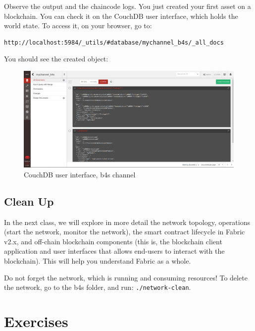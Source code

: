 \documentclass[12pt,a4paper]{article}
\theoremstyle{definition}
\begin{document}
Observe the output and the chaincode logs.
You just created your first asset on a blockchain. You can check it on the CouchDB user interface, which holds the world state. To access it, on your browser, go to: 
\begin{verbatim}
http://localhost:5984/_utils/#database/mychannel_b4s/_all_docs
\end{verbatim}

You should see the created object:

\begin{figure}[h]
    \centering
    \includegraphics[scale=0.2]{figures/couchdb.png}
    \caption{CouchDB user interface, b4s channel}
    \label{fig:cdb}
\end{figure}

\subsection{Clean Up}

In the next class, we will explore in more detail the network topology, operations (start the network, monitor the network), the smart contract lifecycle in Fabric v2.x, and off-chain blockchain components (this is, the blockchain client application and user interfaces that allows end-users to interact with the blockchain). This will help you understand Fabric as a whole.

Do not forget the network, which is running and consuming resources! To delete the network, go to the b4s folder, and run: \texttt{./network-clean}.


\section{Exercises}


\end{document}
